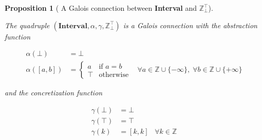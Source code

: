 \documentclass{article}
\newtheorem{proposition}{Proposition}
\begin{document}
\begin{proposition}[
  A Galois connection between \textbf{Interval}
  and $\mathbb{Z}_\bot^\top$
]\label{prop:sgal}

  The quadruple $
    (\textbf{Interval}, \alpha, \gamma, \mathbb{Z}_\bot^\top)
  $ is a Galois connection with the abstraction function

  \begin{align*}
    \alpha(\bot) &= \bot \\
    \alpha([a, b]) &= 
      \begin{cases}
        a & \text{if } a = b \\
        \top & \text{otherwise}
      \end{cases}
    \;\;\; \forall a \in \mathbb{Z} \cup \{-\infty\}, 
    \; \forall b \in \mathbb{Z} \cup \{+\infty\}
  \end{align*}

  and the concretization function

  \begin{align*}
    \gamma(\bot) &= \bot \\
    \gamma(\top) &= \top \\
    \gamma(k) & = [k, k] \;\;\; \forall k \in \mathbb{Z}
  \end{align*}
\end{proposition}
\end{document}
